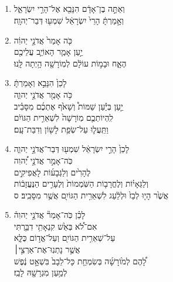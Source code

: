 \documentclass[12pt,a4paper,titlepage]{article}
\def \pscolor{red} %
\def \pslabelsep{0.8em} %
\def \psleftmargin{0em} %
\begin{document}
\begin{hebrew}
\section*{}
\subsection*{}
\vspace{-0.6mm}
\begin{enumerate}[leftmargin=\psleftmargin, labelsep=\pslabelsep, label=\fontspec{Linux Libertine}\arabic*, font=\color{\pscolor}\small\textsuperscript, parsep=0em, itemsep=0em, topsep=0em]
      \item \texthebrew{וְאַתָּ֣ה בֶן־אָדָ֔ם הִנָּבֵ֖א אֶל־הָרֵ֣י יִשְׂרָאֵ֑ל \\ וְאָ֣מַרְתָּ֔ הָרֵי֙ יִשְׂרָאֵ֔ל שִׁמְע֖וּ דְּבַר־יְהוָֽה׃}
      \item \texthebrew{כֹּ֤ה אָמַר֙ אֲדֹנָ֣י יְהוִ֔ה \\ יַ֣עַן אָמַ֧ר הָאוֹיֵ֛ב עֲלֵיכֶ֖ם \\ הֶאָ֑ח וּבָמ֣וֹת עוֹלָ֔ם לְמֽוֹרָשָׁ֖ה הָ֥יְתָה לָּֽנוּ׃}
      \item \texthebrew{לָכֵן֙ הִנָּבֵ֣א וְאָמַרְתָּ֔ \\ כֹּ֥ה אָמַ֖ר אֲדֹנָ֣י יְהוִ֑ה \\ יַ֣עַן בְּיַ֡עַן שַׁמּוֹת֩ וְשָׁאֹ֙ף אֶתְכֶ֜ם מִסָּבִ֗יב \\ לִֽהְיוֹתְכֶ֤ם מֽוֹרָשָׁה֙ לִשְׁאֵרִ֣ית הַגּוֹיִ֔ם \\ וַתֵּֽעֲל֛וּ עַל־שְׂפַ֥ת לָשׁ֖וֹן וְדִבַּת־עָֽם׃}
      \item \texthebrew{לָכֵן֙ הָרֵ֣י יִשְׂרָאֵ֔ל שִׁמְע֖וּ דְּבַר־אֲדֹנָ֣י יְהוִ֑ה \\ כֹּֽה־אָמַ֣ר אֲדֹנָ֣י יְ֠הוִה \\ לֶהָרִ֙ים וְלַגְּבָע֜וֹת לָאֲפִיקִ֣ים \\ וְלַגֵּאָי֗וֹת וְלֶחֳרָב֤וֹת הַשֹּֽׁמְמוֹת֙ וְלֶעָרִ֣ים הַנֶּעֱזָב֔וֹת\\  אֲשֶׁ֙ר הָי֤וּ לְבַז֙ וּלְלַ֔עַג לִשְׁאֵרִ֥ית הַגּוֹיִ֖ם אֲשֶׁ֥ר מִסָּבִֽיב׃ ס}
      \item \texthebrew{לָכֵ֗ן כֹּֽה־אָמַר֘ אֲדֹנָ֣י יְהוִה֒ \\ אִם־לֹ֠א בְּאֵ֙שׁ קִנְאָתִ֥י דִבַּ֛רְתִּי \\ עַל־שְׁאֵרִ֥ית הַגּוֹיִ֖ם וְעַל־אֱד֣וֹם כֻּלָּ֑א \\ אֲשֶׁ֣ר נָתְנֽוּ־אֶת־אַרְצִ֣י׀ \\ לָ֠הֶם לְמ֙וֹרָשָׁ֜ה בְּשִׂמְחַ֤ת כָּל־לֵבָב֙ בִּשְׁאָ֣ט נֶ֔פֶשׁ \\ לְמַ֥עַן מִגְרָשָׁ֖הּ לָבַֽז׃}

\end{enumerate}
\end{hebrew}
\end{document}
